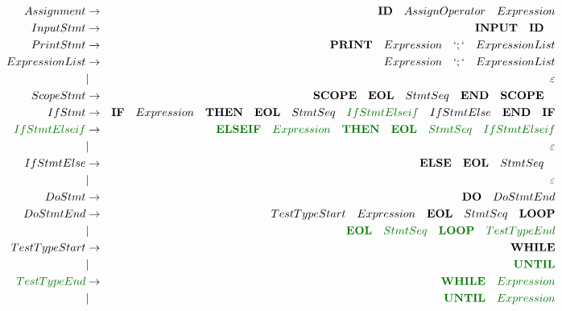 \documentclass[a4paper,11pt,landscape,leqno]{article}
\begin{document}
\begin{eqnarray}
Assignment	& \rightarrow		& \textbf{ID}\quad AssignOperator \quad Expression \\
InputStmt	&	 \rightarrow	& \textbf{INPUT}\quad \textbf{ID}\quad	 \\
PrintStmt	&	 \rightarrow	& \textbf{PRINT}\quad Expression\quad `;` \quad ExpressionList\\
ExpressionList&  \rightarrow	&  Expression\quad `;`\quad ExpressionList\\
			&	 |				& \varepsilon	\\
ScopeStmt	&	 \rightarrow	&	\textbf{SCOPE}\quad   \textbf{EOL} \quad StmtSeq\quad	 \textbf{END}\quad \textbf{SCOPE}\quad	  \\
IfStmt	&\rightarrow& \textbf{IF} \quad Expression \quad \textbf{THEN}\quad \textbf{EOL}\quad StmtSeq \quad \textcolor{green1}{IfStmtElseif}\quad IfStmtElse\quad \textbf{END}\quad \textbf{IF}	\\
\textcolor{green1}{IfStmtElseif}&\rightarrow &\textcolor{green1}{\textbf{ELSEIF}\quad Expression\quad \textbf{THEN}\quad \textbf{EOL}\quad StmtSeq \quad IfStmtElseif}	 \\
&	|	&\textcolor{green1}{\varepsilon}  \\
IfStmtElse&   \rightarrow &\textbf{ELSE}\quad  \textbf{EOL}\quad StmtSeq\quad  \\
&	|	&\textcolor{green1}{\varepsilon}  \\
DoStmt&    \rightarrow	  & \textbf{DO} \quad DoStmtEnd   \\
DoStmtEnd&	 \rightarrow  &  TestTypeStart \quad  Expression \quad \textbf{EOL} \quad StmtSeq \quad \textbf{LOOP}	\\
&	 | &\textcolor{green1}{\textbf{EOL} \quad StmtSeq \quad \textbf{LOOP}\quad TestTypeEnd} \\
TestTypeStart & \rightarrow	&	\textbf{WHILE}\\
		&		|		& \textcolor{green1}{\textbf{UNTIL}} \\
\textcolor{green1}{TestTypeEnd} & \rightarrow	&	\textcolor{green1}{\textbf{WHILE}\quad Expression} \\
&		|		& \textcolor{green1}{\textbf{UNTIL}\quad Expression} \\

\end{eqnarray}
\end{document}

